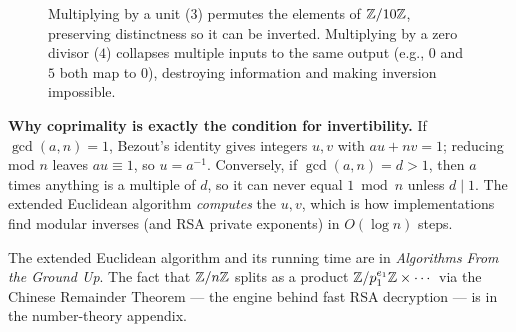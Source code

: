 \begin{figure}[htbp]
\centering
{}
\caption{Multiplying by a unit ($3$) permutes the elements of $\mathbb{Z}/10\mathbb{Z}$, preserving distinctness so it can be inverted. Multiplying by a zero divisor ($4$) collapses multiple inputs to the same output (e.g., $0$ and $5$ both map to $0$), destroying information and making inversion impossible.}
\label{ch41:fig-zero-divisors}
\end{figure}


\begin{whybox}
\textbf{Why coprimality is exactly the condition for invertibility.} If
$\gcd(a,n)=1$, Bezout's identity gives integers $u,v$ with $au+nv=1$; reducing mod
$n$ leaves $au\equiv 1$, so $u=a^{-1}$. Conversely, if $\gcd(a,n)=d>1$, then $a$
times anything is a multiple of $d$, so it can never equal $1\bmod n$ unless $d\mid
1$. The extended Euclidean algorithm \emph{computes} the $u,v$, which is how
implementations find modular inverses (and RSA private exponents) in $O(\log n)$
steps.
\end{whybox}

\begin{connectionbox}
The extended Euclidean algorithm and its running time are in \emph{Algorithms From
the Ground Up}. The fact that $\mathbb{Z}/n\mathbb{Z}$ splits as a product $\mathbb{Z}/p_1^{e_1}\mathbb{Z} \times
\cdots$ via the Chinese Remainder Theorem --- the engine behind fast RSA
decryption --- is in the number-theory appendix.
\end{connectionbox}

